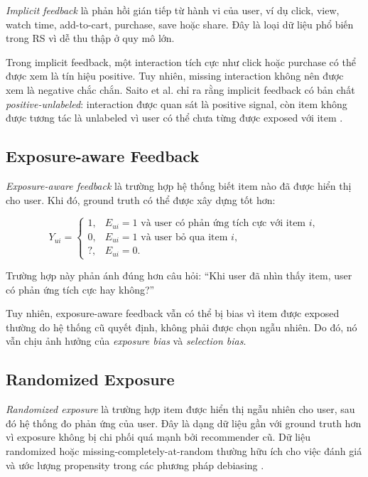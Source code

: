 \documentclass[12pt,a4paper]{article}
\begin{document}
\textit{Implicit feedback} là phản hồi gián tiếp từ hành vi của user, ví dụ click, view, watch time, add-to-cart, purchase, save hoặc share. 
Đây là loại dữ liệu phổ biến trong RS vì dễ thu thập ở quy mô lớn.

Trong implicit feedback, một interaction tích cực như click hoặc purchase có thể được xem là tín hiệu positive. 
Tuy nhiên, missing interaction không nên được xem là negative chắc chắn. 
Saito et al. chỉ ra rằng implicit feedback có bản chất \textit{positive-unlabeled}: interaction được quan sát là positive signal, còn item không được tương tác là unlabeled vì user có thể chưa từng được exposed với item \cite{saito2020unbiased}.

\subsection{Exposure-aware Feedback}

\textit{Exposure-aware feedback} là trường hợp hệ thống biết item nào đã được hiển thị cho user. 
Khi đó, ground truth có thể được xây dựng tốt hơn:

\begin{equation}
Y_{ui} =
\begin{cases}
1, & E_{ui}=1 \text{ và user có phản ứng tích cực với item } i, \\
0, & E_{ui}=1 \text{ và user bỏ qua item } i, \\
?, & E_{ui}=0.
\end{cases}
\end{equation}

Trường hợp này phản ánh đúng hơn câu hỏi: 
``Khi user đã nhìn thấy item, user có phản ứng tích cực hay không?''

Tuy nhiên, exposure-aware feedback vẫn có thể bị bias vì item được exposed thường do hệ thống cũ quyết định, không phải được chọn ngẫu nhiên. 
Do đó, nó vẫn chịu ảnh hưởng của \textit{exposure bias} và \textit{selection bias}.

\subsection{Randomized Exposure}

\textit{Randomized exposure} là trường hợp item được hiển thị ngẫu nhiên cho user, sau đó hệ thống đo phản ứng của user. 
Đây là dạng dữ liệu gần với ground truth hơn vì exposure không bị chi phối quá mạnh bởi recommender cũ. 
Dữ liệu randomized hoặc missing-completely-at-random thường hữu ích cho việc đánh giá và ước lượng propensity trong các phương pháp debiasing \cite{schnabel2016recommendations}.
\end{document}
